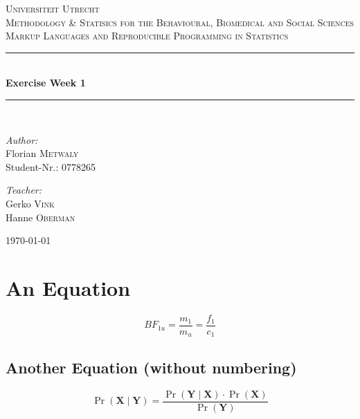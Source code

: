 \documentclass[12pt]{article}
\newcommand\HRule{\rule{\textwidth}{1pt}}
\begin{document}
\renewcommand{\refname}{Bibliography}

\begin{titlepage}

\begin{center}

\textsc{\LARGE Universiteit Utrecht}\\[2.5cm]

\textsc{\Large Methodology \& Statisics for the Behavioural, Biomedical and Social Sciences}\\[1cm]
\textsc{\large Markup Languages and Reproducible Programming in Statistics 
}\\[1cm]
\HRule \\[0.4cm]
{ \LARGE \bfseries Exercise Week 1}\\[0.4cm]

\HRule \\[4cm]
\begin{minipage}{0.45\textwidth}
\begin{flushleft} \large
\emph{Author:}\\
Florian \textsc{Metwaly} \\
Student-Nr.: 0778265
\end{flushleft}
\end{minipage}
\begin{minipage}{0.45\textwidth}
\begin{flushright} \large
\emph{Teacher:} \\
Gerko \textsc{Vink} \\
Hanne \textsc{Oberman} \\
\end{flushright}
\end{minipage}

\vfill

{\large \today} \\

\end{center}

\end{titlepage}

\tableofcontents
\newpage

\section{An Equation}
\begin{equation}
    BF_{1u} = \frac{m_1}{m_u} = \frac{f_1}{c_1}
\end{equation}
\subsection{Another Equation (without numbering)}
$$
\operatorname{Pr}(\boldsymbol{X} \mid \boldsymbol{Y})=\frac{\operatorname{Pr}(\boldsymbol{Y} \mid \boldsymbol{X}) \cdot \operatorname{Pr}(\boldsymbol{X})}{\operatorname{Pr}(\boldsymbol{Y})}
$$
\end{document}

